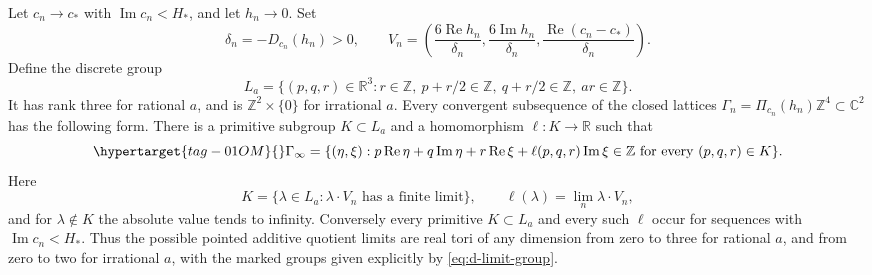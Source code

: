 \begin{theorem}\hypertarget{tag-032H}{}\label{push:src:D.3.1}

Let \(c_n\to c_*\) with \(\operatorname{Im}c_n<H_*\), and let
\(h_n\to0\). Set
\[
 \delta_n=-D_{c_n}(h_n)>0,\qquad
 V_n=\left(\frac{6\operatorname{Re}h_n}{\delta_n},
           \frac{6\operatorname{Im}h_n}{\delta_n},
           \frac{\operatorname{Re}(c_n-c_*)}{\delta_n}\right).
\]
Define the discrete group
\[
 L_a=\{(p,q,r)\in\mathbb R^3:
    r\in\mathbb Z,\ p+r/2\in\mathbb Z,
    \ q+r/2\in\mathbb Z,\ ar\in\mathbb Z\}.
\]
It has rank three for rational \(a\), and is
\(\mathbb Z^2\times\{0\}\) for irrational \(a\).
Every convergent subsequence of the closed lattices
\(\Gamma_n=\Pi_{c_n}(h_n)\mathbb Z^4\subset\mathbb C^2\) has the
following form. There is a primitive subgroup \(K\subset L_a\) and
a homomorphism \(\ell:K\to\mathbb R\) such that
\begin{equation}\hypertarget{tag-01OM}{}\label{eq:d-limit-group}
 \Gamma_\infty=
 \{(\eta,\xi):p\operatorname{Re}\eta+q\operatorname{Im}\eta
       +r\operatorname{Re}\xi+\ell(p,q,r)\operatorname{Im}\xi
       \in\mathbb Z\text{ for every }(p,q,r)\in K\}.
\end{equation}
Here
\[
 K=\{\lambda\in L_a:\lambda\cdot V_n
                      \text{ has a finite limit}\},\qquad
 \ell(\lambda)=\lim_n\lambda\cdot V_n,
\]
and for \(\lambda\notin K\) the absolute value tends to infinity.
Conversely every primitive \(K\subset L_a\) and every such
\(\ell\) occur for sequences with \(\operatorname{Im}c_n<H_*\).
Thus the possible pointed additive quotient limits are real tori of
any dimension from zero to three for rational \(a\), and from zero
to two for irrational \(a\), with the marked groups given explicitly
by \eqref{eq:d-limit-group}.
\end{theorem}



